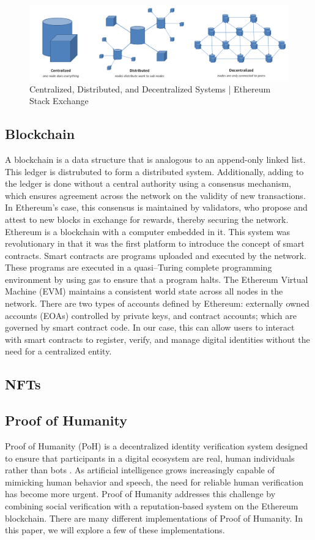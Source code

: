 \documentclass[conference]{IEEEtran}
\begin{document}
\begin{figure}[h!]
    \centering
    \includegraphics[width=0.9\linewidth]{decentralized.png}
    \caption{Centralized, Distributed, and Decentralized Systems | Ethereum Stack Exchange}
    \label{fig:decentralized}
\end{figure}

\subsection{Blockchain}
A blockchain is a data structure that is analogous to an append-only linked list. This ledger is distrubuted to form a distributed system. Additionally, adding to the ledger is done without a central authority using a consensus mechanism, which ensures agreement across the network on the validity of new transactions. In Ethereum’s case, this consensus is maintained by validators, who propose and attest to new blocks in exchange for rewards, thereby securing the network. Ethereum is a blockchain with a computer embedded in it. This system was revolutionary in that it was the first platform to introduce the concept of smart contracts. Smart contracts are programs uploaded and executed by the network. These programs are executed in a quasi–Turing complete programming environment by using gas to ensure that a program halts. The Ethereum Virtual Machine (EVM) maintains a consistent world state across all nodes in the network. There are two types of accounts defined by Ethereum: externally owned accounts (EOAs) controlled by private keys, and contract accounts; which are governed by smart contract code. In our case, this can allow users to interact with smart contracts to register, verify, and manage digital identities without the need for a centralized entity. 

\subsection{NFTs}


\subsection{Proof of Humanity}
Proof of Humanity (PoH) is a decentralized identity verification system designed to ensure that participants in a digital ecosystem are real, human individuals rather than bots \cite{what-is-poh}. As artificial intelligence grows increasingly capable of mimicking human behavior and speech, the need for reliable human verification has become more urgent. Proof of Humanity addresses this challenge by combining social verification with a reputation-based system on the Ethereum blockchain. There are many different implementations of Proof of Humanity. In this paper, we will explore a few of these implementations. 
\end{document}
